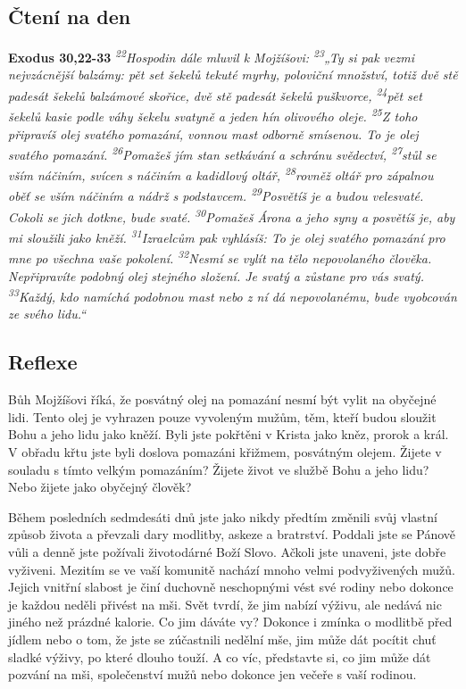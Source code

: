 \documentclass[11pt]{article}
\begin{document}
\subsection*{Čtení na den}
\textbf{Exodus 30,22-33}
\newline
\textit{
\textsuperscript{22}Hospodin dále mluvil k Mojžíšovi:
\textsuperscript{23}„Ty si pak vezmi nejvzácnější balzámy: pět set šekelů tekuté myrhy, poloviční množství, totiž dvě stě padesát šekelů balzámové skořice, dvě stě padesát šekelů puškvorce,
\textsuperscript{24}pět set šekelů kasie podle váhy šekelu svatyně a jeden hín olivového oleje.
\textsuperscript{25}Z toho připravíš olej svatého pomazání, vonnou mast odborně smísenou. To je olej svatého pomazání.
\textsuperscript{26}Pomažeš jím stan setkávání a schránu svědectví,
\textsuperscript{27}stůl se vším náčiním, svícen s náčiním a kadidlový oltář,
\textsuperscript{28}rovněž oltář pro zápalnou oběť se vším náčiním a nádrž s podstavcem.
\textsuperscript{29}Posvětíš je a budou velesvaté. Cokoli se jich dotkne, bude svaté.
\textsuperscript{30}Pomažeš Árona a jeho syny a posvětíš je, aby mi sloužili jako kněží.
\textsuperscript{31}Izraelcům pak vyhlásíš: To je olej svatého pomazání pro mne po všechna vaše pokolení.
\textsuperscript{32}Nesmí se vylít na tělo nepovolaného člověka. Nepřipravíte podobný olej stejného složení. Je svatý a zůstane pro vás svatý.
\textsuperscript{33}Každý, kdo namíchá podobnou mast nebo z ní dá nepovolanému, bude vyobcován ze svého lidu.“
}

\subsection*{Reflexe}
Bůh Mojžíšovi říká, že posvátný olej na pomazání nesmí být vylit na obyčejné lidi. Tento olej je vyhrazen pouze
vyvoleným mužům, těm, kteří budou sloužit Bohu a jeho lidu jako kněží. Byli jste pokřtěni v Krista jako kněz, prorok a
král. V obřadu křtu jste byli doslova pomazáni křižmem, posvátným olejem. Žijete v souladu s tímto velkým
pomazáním? Žijete život ve službě Bohu a jeho lidu? Nebo žijete jako obyčejný člověk?

Během posledních sedmdesáti dnů jste jako nikdy předtím změnili svůj vlastní způsob života a převzali dary modlitby,
askeze a bratrství. Poddali jste se Pánově vůli a denně jste požívali životodárné Boží Slovo. Ačkoli jste unaveni, jste
dobře vyživeni. Mezitím se ve vaší komunitě nachází mnoho velmi podvyživených mužů. Jejich vnitřní slabost je činí
duchovně neschopnými vést své rodiny nebo dokonce je každou neděli přivést na mši. Svět tvrdí, že jim nabízí výživu,
ale nedává nic jiného než prázdné kalorie. Co jim dáváte vy? Dokonce i zmínka o modlitbě před jídlem nebo o tom, že
jste se zúčastnili nedělní mše, jim může dát pocítit chuť sladké výživy, po které dlouho touží. A co víc, představte si,
co jim může dát pozvání na mši, společenství mužů nebo dokonce jen večeře s vaší rodinou.
\end{document}
